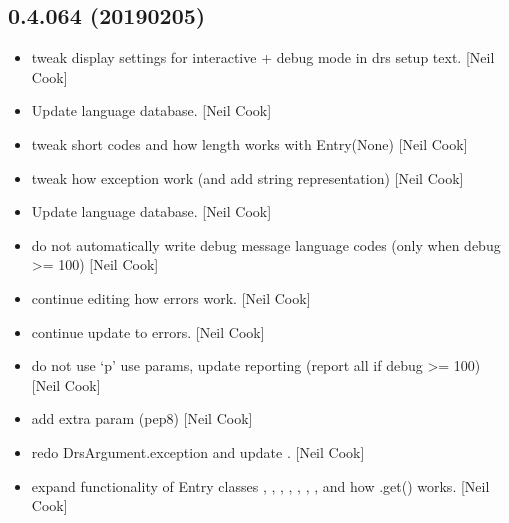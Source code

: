 \documentclass[a4paper,10pt,english]{report}
\begin{document}
\subsection{0.4.064 (2019\sphinxhyphen{}02\sphinxhyphen{}05)}
\label{\detokenize{misc/changelog:id214}}\begin{itemize}
\item {} 
 \sphinxhyphen{} tweak display settings for interactive + debug mode
in drs setup text. {[}Neil Cook{]}

\item {} 
Update language database. {[}Neil Cook{]}

\item {} 
 \sphinxhyphen{} tweak short codes and how length works with Entry(None)
{[}Neil Cook{]}

\item {} 
 \sphinxhyphen{} tweak how exception work (and add string
representation) {[}Neil Cook{]}

\item {} 
Update language database. {[}Neil Cook{]}

\item {} 
 \sphinxhyphen{} do not automatically write debug message language
codes (only when debug \textgreater{}= 100) {[}Neil Cook{]}

\item {} 
 \sphinxhyphen{} continue editing how errors work. {[}Neil Cook{]}

\item {} 
 \sphinxhyphen{} continue update to errors. {[}Neil Cook{]}

\item {} 
 \sphinxhyphen{} do not use ‘p’ use params, update reporting (report all
if debug \textgreater{}= 100) {[}Neil Cook{]}

\item {} 
 \sphinxhyphen{} add extra param (pep8) {[}Neil Cook{]}

\item {} 
 \sphinxhyphen{} redo DrsArgument.exception and update .
{[}Neil Cook{]}

\item {} 
 \sphinxhyphen{} expand functionality of Entry classes ,
, , , , , , 
and how .get() works. {[}Neil Cook{]}


\end{itemize}
\end{document}
